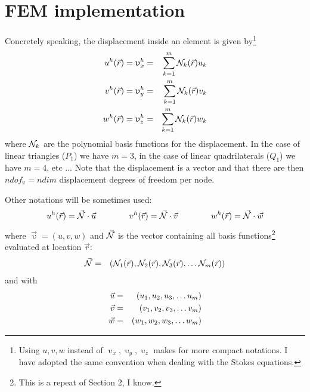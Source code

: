 \section{FEM implementation}

Concretely speaking, the displacement inside an element is given 
by\footnote{Using $u,v,w$ instead of $\upupsilon_x,\upupsilon_y,\upupsilon_z$
makes for more compact notations. I have adopted the same convention
when dealing with the Stokes equations.}
\begin{eqnarray}
u^h(\vec{r}) = \upupsilon_x^h &=& \sum_{k=1}^m {\mathcal{N}}_k(\vec{r}) u_k \nonumber\\
v^h(\vec{r}) = \upupsilon_y^h &=& \sum_{k=1}^m {\mathcal{N}}_k(\vec{r}) v_k \nonumber\\
w^h(\vec{r}) = \upupsilon_z^h &=& \sum_{k=1}^m {\mathcal{N}}_k(\vec{r}) w_k 
\end{eqnarray}
where ${\mathcal{N}}_k$ are the polynomial basis functions for the displacement.
In the case of linear triangles ($P_1$) we have $m=3$, in the case of linear
quadrilaterals ($Q_1$) we have $m=4$, etc ... 
Note that the displacement is a vector and that there are then $ndof_\upupsilon=ndim$ 
displacement degrees of freedom per node.

Other notations will be sometimes used:
\begin{equation}
u^h({\vec r}) = \vec{{\mathcal{N}}} \cdot \vec{u}
\quad\quad\quad\quad
v^h({\vec r}) = \vec{{\mathcal{N}}} \cdot \vec{v}
\quad\quad\quad\quad
w^h({\vec r}) = \vec{{\mathcal{N}}} \cdot \vec{w}
\end{equation} 
where ${\vec \upupsilon}=(u,v,w)$ and $\vec{{\mathcal{N}}}$ is the vector containing 
all basis functions\footnote{This is a repeat of Section 2, I know.} 
evaluated at location ${\vec r}$:
\begin{eqnarray}
\vec{{\mathcal{N}}} &=& \left( {\mathcal{N}}_1({\vec r}),  {\mathcal{N}}_2({\vec r}),  
{\mathcal{N}}_3({\vec r}), \dots  {\mathcal{N}}_{m}({\vec r}) \right) 
\end{eqnarray}
and with 
\begin{eqnarray}
\vec{u} &=& \left( u_1,  u_2,  u_3, \dots  u_m \right) \nonumber\\
\vec{v} &=& \left( v_1,  v_2,  v_3, \dots  v_m \right) \nonumber\\
\vec{w} &=& \left( w_1,  w_2,  w_3, \dots  w_m \right) 
\end{eqnarray}

